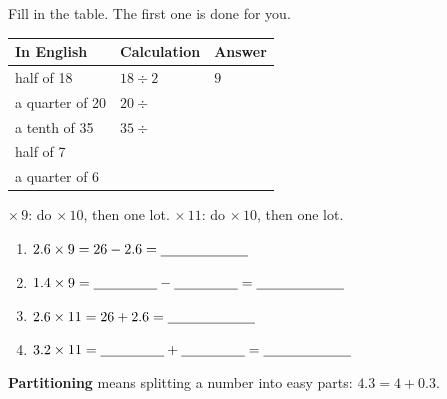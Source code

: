 \documentclass[12pt,a4paper]{article}
\newif\iffr
\newcommand{\fr}[1]{\unskip\iffr\par\vspace{1pt}\noindent{\small\itshape\color{black!60}#1}\par\fi}
\newcommand{\nbox}{\ \fbox{\rule{0pt}{1.05em}\rule{1.0em}{0pt}}\ }
\newcommand{\tall}{\rule[-0.6em]{0pt}{1.9em}}
\renewcommand{\tall}{\rule[-0.8em]{0pt}{2.4em}}
\begin{document}
\vspace{2pt}
\noindent Fill in the table. The first one is done for you.
\fr{Compl\`ete le tableau. La premi\`ere ligne est faite pour toi.}

\vspace{4pt}
\begin{center}
\begin{tabular}{|C{4.0cm}|C{3.6cm}|C{2.6cm}|}
  \hline
  \textbf{In English} & \textbf{Calculation} & \textbf{Answer} \\ \hline
  half of 18 \tall       & $18 \div 2$ & $9$ \\ \hline
  a quarter of 20 \tall  & $20 \div$ \nbox & \\ \hline
  a tenth of 35 \tall    & $35 \div$ \nbox & \\ \hline
  half of 7 \tall        & & \\ \hline
  a quarter of 6 \tall   & & \\ \hline
\end{tabular}
\end{center}


\begin{remember}
  $\times\, 9$: do $\times\, 10$, then  one lot. \qquad
  $\times\, 11$: do $\times\, 10$, then  one lot.
  \fr{$\times\, 9$~: multiplie par 10, puis retire le nombre une fois. \quad
  $\times\, 11$~: multiplie par 10, puis ajoute-le une fois.}
\end{remember}

\vspace{4pt}
\begin{enumerate}[label=(\alph*), itemsep=12pt]
  \item $2.6 \times 9 = 26 - 2.6 = \blank[2.2cm]$
  \item $1.4 \times 9 = \blank[1.6cm] - \blank[1.6cm] = \blank[2.2cm]$
  \item $2.6 \times 11 = 26 + 2.6 = \blank[2.2cm]$
  \item $3.2 \times 11 = \blank[1.6cm] + \blank[1.6cm] = \blank[2.2cm]$
\end{enumerate}


\noindent \textbf{Partitioning} means splitting a number into easy parts:
$4.3 = 4 + 0.3$.
\fr{\eng{Partitioning}~: d\'ecomposer un nombre en parties faciles \`a calculer.}
\end{document}
